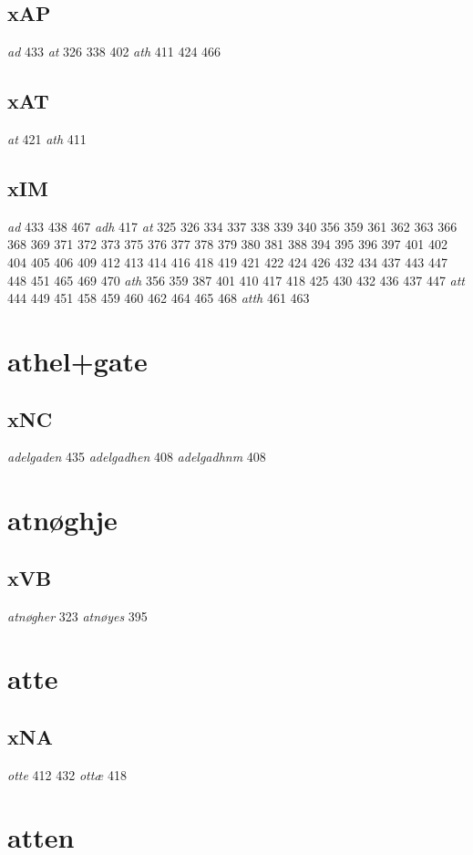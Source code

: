 \documentclass[a4paper,twocolumn]{article}
\begin{document}
\subsection{xAP}
\label{sec:org8192bfe}
\emph{ad} 433 \emph{at} 326 338 402 \emph{ath} 411 424 466 
\subsection{xAT}
\label{sec:org7fbb324}
\emph{at} 421 \emph{ath} 411 
\subsection{xIM}
\label{sec:org894da79}
\emph{ad} 433 438 467 \emph{adh} 417 \emph{at} 325 326 334 337 338 339 340 356 359 361 362 363 366 368 369 371 372 373 375 376 377 378 379 380 381 388 394 395 396 397 401 402 404 405 406 409 412 413 414 416 418 419 421 422 424 426 432 434 437 443 447 448 451 465 469 470 \emph{ath} 356 359 387 401 410 417 418 425 430 432 436 437 447 \emph{att} 444 449 451 458 459 460 462 464 465 468 \emph{atth} 461 463 
\section{athel+gate}
\label{sec:orge61486a}
\subsection{xNC}
\label{sec:orgc2c0f7e}
\emph{adelgaden} 435 \emph{adelgadhen} 408 \emph{adelgadhnm} 408 
\section{atnøghje}
\label{sec:orgbb9b5e9}
\subsection{xVB}
\label{sec:orgcb2aa5f}
\emph{atnøgher} 323 \emph{atnøyes} 395 
\section{atte}
\label{sec:org9d7b78a}
\subsection{xNA}
\label{sec:org92e7603}
\emph{otte} 412 432 \emph{ottæ} 418 
\section{atten}
\label{sec:orgc54b612}
\end{document}
